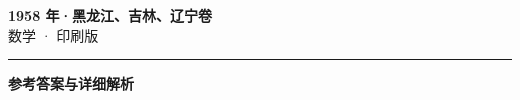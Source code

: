 \documentclass[zihao=5, a4paper]{ctexart}
\begin{document}
\begin{center}
  {\Large\bfseries 1958 年·黑龙江、吉林、辽宁卷}\\[4pt]
  {\large 数学 · 印刷版}
\end{center}
\medskip
{}

\par\bigskip\hrule\bigskip
{}
\begin{center}{\large\bfseries 参考答案与详细解析}\end{center}
\smallskip

\end{document}
